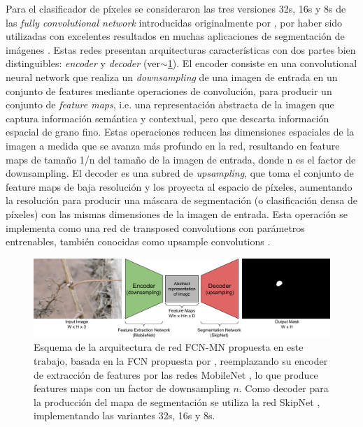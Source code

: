 \documentclass[a4paper,authoryear,review]{elsarticle}
\begin{document}
Para el clasificador de píxeles se consideraron las tres versiones 32s, 16s y 8s de las \emph{fully convolutional network} introducidas originalmente por \citet{long2015fully}, por haber sido utilizadas con excelentes resultados en muchas aplicaciones de segmentación de imágenes \cite{litjens2017survey, garcia2018survey, kaymak2019brief}. Estas redes presentan arquitecturas características con dos partes bien distinguibles: \emph{encoder} y \emph{decoder} (ver$\sim$\ref{fig:FCN-MN}). 
%
El encoder consiste en una convolutional neural network que realiza un \emph{downsampling} de una imagen de entrada en un conjunto de features mediante operaciones de convolución, para producir un conjunto de \emph{feature maps}, i.e. una representación abstracta de la imagen que captura información semántica y contextual, pero que descarta información espacial de grano fino. Estas operaciones reducen las dimensiones espaciales de la imagen a medida que se avanza más profundo en la red, resultando en feature maps de tamaño 1/n del tamaño de la imagen de entrada, donde n es el factor de downsampling. El decoder es una subred de \emph{upsampling}, que toma el conjunto de feature maps de baja resolución y los proyecta al espacio de píxeles, aumentando la resolución para producir una máscara de segmentación (o clasificación densa de píxeles) con las mismas dimensiones de la imagen de entrada. Esta operación se implementa como una red de transposed convolutions con parámetros entrenables, también conocidas como upsample convolutions \citet{shelhamer2017fully}. 



\begin{figure}
    \centering
    \includegraphics[width=12cm]{figures/Figure1.png}
    \caption{Esquema de la arquitectura de red FCN-MN propuesta en este trabajo, basada en la FCN propuesta por \citet{shelhamer2017fully}, reemplazando su encoder de extracción de features por las redes MobileNet \cite{howard2017mobilenets}, lo que produce features maps con un factor de downsampling $n$. Como decoder para la producción  del mapa de segmentación se utiliza la red SkipNet \cite{siam2018rtseg}, implementando las variantes 32s, 16s y 8s.}
    \label{fig:FCN-MN}
\end{figure}
\end{document}
